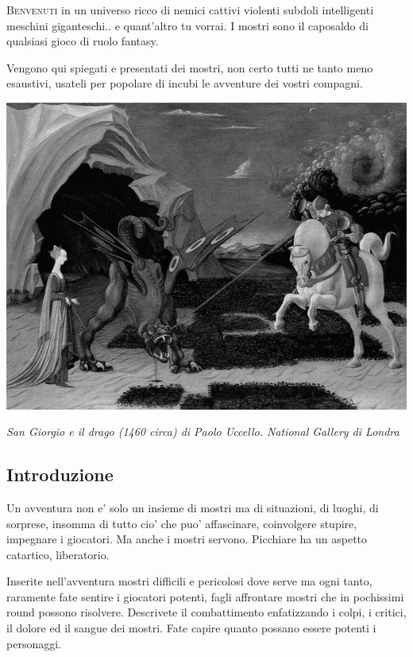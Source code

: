 \begin{multicols}{2}

\lettrine[lines=2, lhang=0.33, loversize=0.25, findent=1.5em]{B}{envenuti} in un universo ricco di nemici cattivi violenti subdoli intelligenti meschini giganteschi.. e quant'altro tu vorrai. I mostri sono il caposaldo di qualsiasi gioco di ruolo fantasy.

Vengono qui spiegati e presentati dei mostri, non certo tutti ne tanto meno esaustivi, usateli per popolare di incubi le avventure dei vostri compagni.

\medskip

\includegraphics[width=0.8\linewidth]{immagini/sangiorgioedrago.png}
\begin{center}
\textit{San Giorgio e il drago (1460 circa) di Paolo Uccello. National Gallery di Londra}
\end{center}

\subsection{Introduzione}

Un avventura non e' solo un insieme di mostri ma di situazioni, di luoghi, di sorprese, insomma di tutto cio' che puo' affascinare, coinvolgere stupire, impegnare i giocatori. Ma anche i mostri servono. Picchiare ha un aspetto catartico, liberatorio.

Inserite nell'avventura mostri difficili e pericolosi dove serve ma ogni tanto, raramente fate sentire i giocatori potenti, fagli affrontare mostri che in pochissimi round possono risolvere. Descrivete il combattimento enfatizzando i colpi, i critici, il dolore ed il sangue dei mostri. Fate capire quanto possano essere potenti i personaggi.


\end{multicols}
